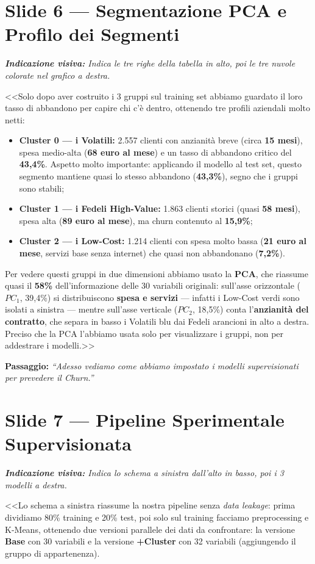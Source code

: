 \documentclass[10pt, a4paper]{article}
\newcommand{\cue}[1]{%
  \par\vspace{1pt}\noindent\colorbox{CueBg}{\parbox{\dimexpr\linewidth-2\fboxsep}{\footnotesize\textit{\color{PrimaryNavy}\textbf{Indicazione visiva:} #1}}}\par\vspace{2pt}%
}
\newcommand{\transition}[1]{%
  \par\vspace{1pt}\noindent\colorbox{LightBg}{\parbox{\dimexpr\linewidth-2\fboxsep}{\small\textbf{\color{SecondaryBlue}Passaggio:} \textit{``#1''}}}\par\vspace{2pt}%
}
\begin{document}
\section*{Slide 6 --- Segmentazione PCA e Profilo dei Segmenti}
\cue{Indica le tre righe della tabella in alto, poi le tre nuvole colorate nel grafico a destra.}
\noindent <<Solo dopo aver costruito i 3 gruppi sul training set abbiamo guardato il loro tasso di abbandono per capire chi c'è dentro, ottenendo tre profili aziendali molto netti:
\begin{itemize}
    \item \textbf{Cluster 0 --- i Volatili:} 2.557 clienti con anzianità breve (circa \textbf{15 mesi}), spesa medio-alta (\textbf{68 euro al mese}) e un tasso di abbandono critico del \textbf{43,4\%}. Aspetto molto importante: applicando il modello al test set, questo segmento mantiene quasi lo stesso abbandono (\textbf{43,3\%}), segno che i gruppi sono stabili;
    \item \textbf{Cluster 1 --- i Fedeli High-Value:} 1.863 clienti storici (quasi \textbf{58 mesi}), spesa alta (\textbf{89 euro al mese}), ma churn contenuto al \textbf{15,9\%};
    \item \textbf{Cluster 2 --- i Low-Cost:} 1.214 clienti con spesa molto bassa (\textbf{21 euro al mese}, servizi base senza internet) che quasi non abbandonano (\textbf{7,2\%}).
\end{itemize}
Per vedere questi gruppi in due dimensioni abbiamo usato la \textbf{PCA}, che riassume quasi il \textbf{58\%} dell'informazione delle 30 variabili originali: sull'asse orizzontale ($PC_1$, 39,4\%) si distribuiscono \textbf{spesa e servizi} --- infatti i Low-Cost verdi sono isolati a sinistra --- mentre sull'asse verticale ($PC_2$, 18,5\%) conta l'\textbf{anzianità del contratto}, che separa in basso i Volatili blu dai Fedeli arancioni in alto a destra. Preciso che la PCA l'abbiamo usata solo per visualizzare i gruppi, non per addestrare i modelli.>>
\transition{Adesso vediamo come abbiamo impostato i modelli supervisionati per prevedere il Churn.}

\section*{Slide 7 --- Pipeline Sperimentale Supervisionata}
\cue{Indica lo schema a sinistra dall'alto in basso, poi i 3 modelli a destra.}
\noindent <<Lo schema a sinistra riassume la nostra pipeline senza \textit{data leakage}: prima dividiamo 80\% training e 20\% test, poi solo sul training facciamo preprocessing e K-Means, ottenendo due versioni parallele dei dati da confrontare: la versione \textbf{Base} con 30 variabili e la versione \textbf{+Cluster} con 32 variabili (aggiungendo il gruppo di appartenenza).
\end{document}
